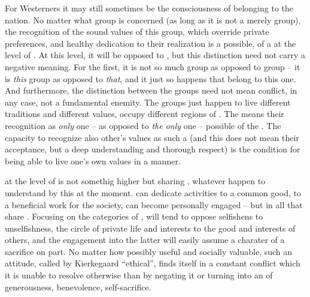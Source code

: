 {\subpa
For Westerners it may still sometimes be the consciousness of
belonging to the nation.  No matter what group is concerned (as long
as it is not a merely  group), the recognition of the sound
values of this group, which override  private preferences, and
healthy dedication to their realization is a possible,  of a  at the level of .  At this
level, it will be opposed to ,  but this
distinction need not carry a negative meaning.  For the first, it is
not so much  group as opposed to  group -- it is
{\em this} group as opposed to {\em that}, and it just so happens that
 belong to this one.  And furthermore, the distinction between
the groups need not mean conflict, in any case, not a fundamental
enemity.  The groups just happen to live different traditions and
different values, occupy different regions of .  The
 means their recognition as {\em
only} one -- as opposed to {\em the only} one -- possible
 of the .  The capacity to recognize
also other's values as such a  (and this does not
mean their acceptance, but a deep understanding and thorough respect)
is the condition for being able to live one's own values in a 
 manner. 

\pa %
 at the level of  is not  
somethig higher but sharing , 
whatever  happen to understand by this at the moment.  can 
dedicate  activities to a common good, to a beneficial work for 
the society,  can become personally engaged -- but in all that 
 share .
Focusing on the 
categories of ,  will tend to oppose selfishens to 
unselfishness, the circle of  private life and interests to 
the good and interests of others, and the engagement into the latter 
will easily assume a charater of a sacrifice on  part. No 
matter how possibly useful and socially valuable, such an attitude, 
called by Kierkegaard ``ethical'', finds itself in a constant conflict 
which it is unable to resolve otherwise than by negating it or 
turning  into an  of  generousness, 
 benevolence,  self-sacrifice.

}
